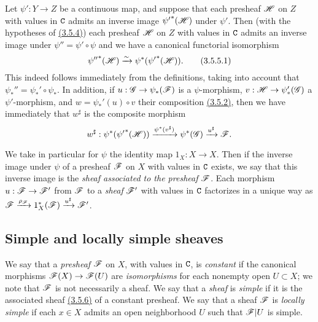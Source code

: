 \begin{env}[3.5.5]
\label{0.3.5.5}
Let $\psi':Y\to Z$ be a continuous map, and suppose that each presheaf $\mathscr{H}$
on $Z$ with values in $\mathtt{C}$ admits an inverse image ${\psi'}^*(\mathscr{H})$ under
$\psi'$. Then (with the hypotheses of \hyperref[0.3.5.4]{(3.5.4)}) each presheaf $\mathscr{H}$
on $Z$ with values in $\mathtt{C}$ admits an inverse image under $\psi''=\psi'\circ\psi$
and we have a canonical functorial isomorphism
\[
  {\psi''}^*(\mathscr{H})\xrightarrow{\sim}\psi^*({\psi'}^*(\mathscr{H})).
  \tag{3.5.5.1}
\]
This indeed follows immediately from the definitions, taking into account that
$\psi_*''=\psi_*'\circ\psi_*$. In addition, if $u:\mathscr{G}\to\psi_*(\mathscr{F})$ is a
$\psi$-morphism, $v:\mathscr{H}\to\psi_*'(\mathscr{G})$ a $\psi'$-morphism, and
$w=\psi_*'(u)\circ v$ their composition \hyperref[0.3.5.2]{(3.5.2)}, then we have
immediately that $w^\sharp$ is the composite morphism
\[
  w^\sharp:\psi^*({\psi'}^*(\mathscr{H}))\xrightarrow{\psi^*(v^\sharp)}\psi^*(\mathscr{G})
  \xrightarrow{u^\sharp}\mathscr{F}.
\]
\end{env}

\begin{env}[3.5.6]
\label{0.3.5.6}
We take in particular for $\psi$ the identity map $1_X:X\to X$. Then if the
inverse image under $\psi$ of a presheaf $\mathscr{F}$ on $X$ with values in $\mathtt{C}$
exists, we say that this inverse image is the {\em sheaf associated to the
presheaf $\mathscr{F}$}. Each morphism $u:\mathscr{F}\to\mathscr{F}'$ from $\mathscr{F}$ to a
{\em sheaf} $\mathscr{F}'$ with values in $\mathtt{C}$ factorizes in a unique way as
$\mathscr{F}\xrightarrow{\rho_\mathscr{F}}1_X^*(\mathscr{F})\xrightarrow{u^\sharp}\mathscr{F}'$.
\end{env}

\subsection{Simple and locally simple sheaves}
\label{subsection-simple-and-locally-simple-sheaves}

\begin{env}[3.6.1]
\label{0.3.6.1}
We say that a {\em presheaf} $\mathscr{F}$ on $X$, with values in $\mathtt{C}$, is
{\em constant} if the canonical morphisms $\mathscr{F}(X)\to\mathscr{F}(U)$ are
{\em isomorphisms} for each nonempty open $U\subset X$; we note that $\mathscr{F}$
is not necessarily a sheaf. We say that a {\em sheaf} is {\em simple} if it is
the associated sheaf \hyperref[0.3.5.6]{(3.5.6)} of a constant presheaf. We say that a
sheaf $\mathscr{F}$ is {\em locally simple} if each $x\in X$ admits an open
neighborhood $U$ such that $\mathscr{F}|U$ is simple.
\end{env}

